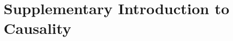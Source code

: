 \documentclass[10pt]{article} %
\theoremstyle{definition}
\begin{document}







\clearpage

\appendix
\section{Supplementary Introduction to Causality}
\label{app:supp}
\end{document}
